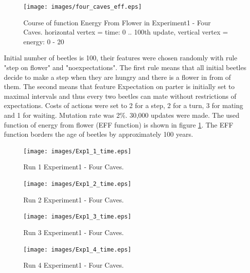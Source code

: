 \documentclass[a4paper,12pt]{report}
\begin{document}
\begin{figure}
\begin{center}
  \texttt{[image: images/four\_caves\_eff.eps]}
  \caption{Course of function Energy From Flower in Experiment1 - Four Caves. horizontal vertex = time: 0 .. 100th update, vertical vertex = energy: 0 - 20}
  \label{img.four_caves_eff}
\end{center}
\end{figure}

Initial number of beetles is 100, their features were chosen randomly with rule "step on flower" and "noexpectations". The first rule means that all initial beetles decide to make a step when they are hungry and there is a flower in from of them. The second means that feature Expectation on parter is initially set to maximal intervals and thus every two beetles can mate without restrictions of expectations. Costs of actions were set to 2 for a step, 2 for a turn, 3 for mating and 1 for waiting. Mutation rate was 2\%. 30,000 updates were made. The used function of energy from flower (EFF function) is shown in figure \ref{img.four_caves_eff}. The EFF function borders the age of beetles by approximately 100 years.



\begin{figure}
\begin{center}
  \texttt{[image: images/Exp1\_1\_time.eps]}
  \caption{Run 1 Experiment1 - Four Caves.}
  \label{img.four_caves_run1_time}
\end{center}
\end{figure}

\begin{figure}
\begin{center}
  \texttt{[image: images/Exp1\_2\_time.eps]}
  \caption{Run 2 Experiment1 - Four Caves.}
  \label{img.four_caves_run2_time}
\end{center}
\end{figure}

\begin{figure}
\begin{center}
  \texttt{[image: images/Exp1\_3\_time.eps]}
  \caption{Run 3 Experiment1 - Four Caves.}
  \label{img.four_caves_run3_time}
\end{center}
\end{figure}

\begin{figure}
\begin{center}
  \texttt{[image: images/Exp1\_4\_time.eps]}
  \caption{Run 4 Experiment1 - Four Caves.}
  \label{img.four_caves_run4_time}
\end{center}
\end{figure}
\end{document}
